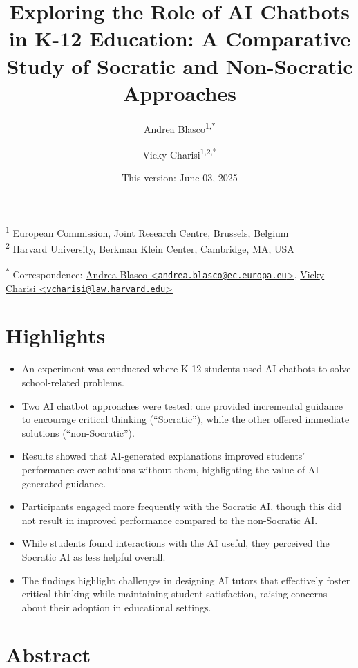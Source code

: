 \documentclass[
  11pt,
]{article}
\title{Exploring the Role of AI Chatbots in K-12 Education: A Comparative Study of Socratic and Non-Socratic Approaches}
\author{Andrea Blasco\textsuperscript{1,*} \and Vicky Charisi\textsuperscript{1,2,*}}
\date{This version: June 03, 2025}
\begin{document}
\maketitle

\textsuperscript{1} European Commission, Joint Research Centre, Brussels, Belgium\\
\textsuperscript{2} Harvard University, Berkman Klein Center, Cambridge, MA, USA

\textsuperscript{*} Correspondence: \href{mailto:andrea.blasco@ec.europa.eu}{Andrea Blasco \textless{}\href{mailto:andrea.blasco@ec.europa.eu}{\nolinkurl{andrea.blasco@ec.europa.eu}}\textgreater{}}, \href{mailto:vcharisi@law.harvard.edu}{Vicky Charisi \textless{}\href{mailto:vcharisi@law.harvard.edu}{\nolinkurl{vcharisi@law.harvard.edu}}\textgreater{}}

\section*{Highlights}\label{highlights}

\begin{itemize}
\item
  An experiment was conducted where K-12 students used AI chatbots to solve school-related problems.
\item
  Two AI chatbot approaches were tested: one provided incremental guidance to encourage critical thinking (``Socratic''), while the other offered immediate solutions (``non-Socratic'').
\item
  Results showed that AI-generated explanations improved students' performance over solutions without them, highlighting the value of AI-generated guidance.
\item
  Participants engaged more frequently with the Socratic AI, though this did not result in improved performance compared to the non-Socratic AI.
\item
  While students found interactions with the AI useful, they perceived the Socratic AI as less helpful overall.
\item
  The findings highlight challenges in designing AI tutors that effectively foster critical thinking while maintaining student satisfaction, raising concerns about their adoption in educational settings.
\end{itemize}

\section*{Abstract}\label{abstract}
\end{document}
